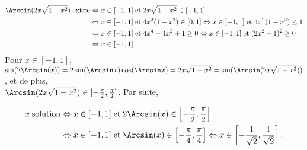 {\begin{enumerate}
{\begin{align*}
\Arcsin(2x\sqrt{1-x^2})\;\mbox{existe}&\Leftrightarrow x\in[-1,1]\;\mbox{et}\;2x\sqrt{1-x^2}\in[-1,1]\\
 &\Leftrightarrow x\in[-1,1]\;\mbox{et}\;4x^2(1-x^2)\in[0,1]\Leftrightarrow x\in[-1,1]\;\mbox{et}\;4x^2(1-x^2)\leq1\\
 &\Leftrightarrow x\in[-1,1]\;\mbox{et}\;4x^4-4x^2+1\geq0\Leftrightarrow x\in[-1,1]\;\mbox{et}\;(2x^2-1)^2\geq0\\
 &\Leftrightarrow x\in[-1,1]
\end{align*}
Pour $x\in[-1,1]$, $\sin(2\Arcsin(x))=2\sin(\Arcsin x)\cos(\Arcsin x)=2x\sqrt{1-x^2}=\sin(\Arcsin(2x\sqrt{1-x^2}))$, et
de plus,\\
$\Arcsin(2x\sqrt{1-x^2})\in[-\frac{\pi}{2},\frac{\pi}{2}]$. Par suite,

\begin{align*}
x\;\mbox{solution}&\Leftrightarrow x\in[-1,1]\;\mbox{et}\;2\Arcsin(x)\in\left[-\frac{\pi}{2},\frac{\pi}{2}\right]\\
 &\Leftrightarrow x\in[-1,1]\;\mbox{et}\;\Arcsin(x)\in\left[-\frac{\pi}{4},\frac{\pi}{4}\right]\Leftrightarrow
x\in\left[-\frac{1}{\sqrt{2}},\frac{1}{\sqrt{2}}\right].
\end{align*}

\begin{center}
\end{center}}
\end{enumerate}
}
